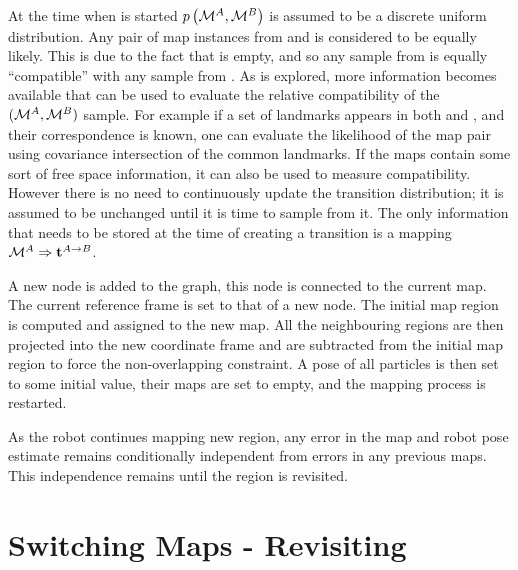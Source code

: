 At the time when \mapB is started $\prob{\mapA,\mapB}$ is assumed to
be a discrete uniform distribution. Any pair of map instances from
\mapA and \mapB is considered to be equally likely. This is due
to the fact that \mapB is empty, and so any sample from \mapB is
equally ``compatible'' with any sample from \mapA. As \mapB is
explored, more information becomes available that can be used to
evaluate the relative compatibility of the $(\mapA,\mapB)$ sample. For
example if a set of landmarks appears in both \mapA and \mapB, and
their correspondence is known, one can evaluate the likelihood of the
map pair using covariance intersection \cite{cov_intersection}
of the common landmarks. If the maps contain some sort of free space
information, it can also be used to measure compatibility. However
there is no need to continuously update the transition distribution;
it is assumed to be unchanged until it is time to sample from it. The
only information that needs to be stored at the time of creating a
transition is a mapping $\mapA \Rightarrow \tr{}{A}{B}$.

A new node is added to the graph, this node is connected to the
current map.  The current reference frame is set to that of a new
node. The initial map region is computed and assigned to the new
map. All the neighbouring regions are then projected into the new
coordinate frame and are subtracted from the initial map region to
force the non-overlapping constraint. A pose of all particles is then
set to some initial value, their maps are set to empty, and the
mapping process is restarted.

As the robot continues mapping new region, any error in the map and robot
pose estimate remains conditionally independent from errors in any
previous maps. This independence remains until the region is
revisited.


\section{Switching Maps - Revisiting}
\label{sec:revisiting}

